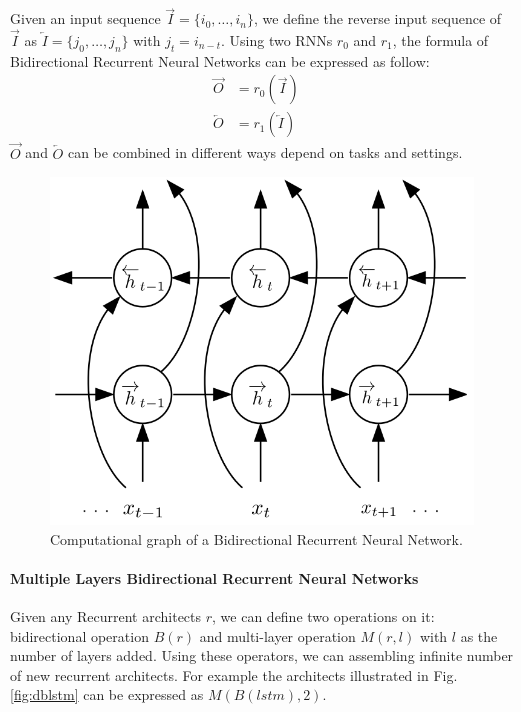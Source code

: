 Given an input sequence \(\overrightarrow{I} = \{i_0,\ldots,i_n\}\), we define the reverse input sequence of \(\overrightarrow{I}\) as \(\overleftarrow{I} = \{j_0,\ldots,j_n\}\) with \(j_t = i_{n-t}\). 
Using two RNNs \(r_0\) and \(r_1\), the formula of Bidirectional Recurrent Neural Networks can be expressed as follow:
\begin{align}
	\overrightarrow{O} &= r_0(\overrightarrow{I}) &\\
	\overleftarrow{O} &= r_1(\overleftarrow{I}) &
\end{align}
\(\overrightarrow{O}\) and \(\overleftarrow{O}\) can be combined in different ways depend on tasks and settings\cite{GravesLSTM}\cite{Graves-thesis}\cite{treeLSTM}.

\begin{figure}[H]
	\centering
	\includegraphics[scale=0.4]{figure/blstm}
	\caption{Computational graph of a Bidirectional Recurrent Neural Network\cite{GravesLSTM}.}
	\label{fig:blstm}
\end{figure}

\paragraph{Multiple Layers Bidirectional Recurrent Neural Networks}
Given any Recurrent architects \(r\), we can define two operations on it: bidirectional operation \(B(r)\) and multi-layer operation \(M(r, l)\) with \(l\) as the number of layers added.
Using these operators, we can assembling infinite number of new recurrent architects. 
For example the architects illustrated in Fig.\ref{fig:dblstm} can be expressed as \(M(B(lstm), 2)\).

